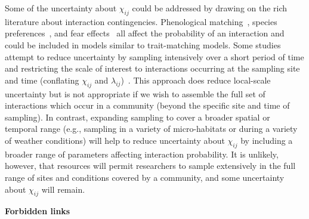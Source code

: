 \documentclass[12pt]{article}
\begin{document}
\begin{spacing}{1.5}
          Some of the uncertainty about $\chi_{ij}$ could be addressed by drawing on the rich literature about interaction contingencies. Phenological matching~\citep{MillerRushing2010}, species preferences~\citep{Pires2011a,Novak2015}, and fear effects~\citep{Luttbeg2005} all affect the probability of an interaction and could be included in models similar to trait-matching models. Some studies attempt to reduce uncertainty by sampling intensively over a short period of time and restricting the scale of interest to interactions occurring at the sampling site and time (conflating $\chi_{ij}$ and $\lambda_{ij}$)~\citep{Bartomeus2013,Weinstein2017a}. This approach does reduce local-scale uncertainty but is not appropriate if we wish to assemble the full set of interactions which occur in a community (beyond the specific site and time of sampling). In contrast, expanding sampling to cover a broader spatial or temporal range (e.g., sampling in a variety of micro-habitats or during a variety of weather conditions) will help to reduce uncertainty about $\chi_{ij}$ by including a broader range of parameters affecting interaction probability. It is unlikely, however, that resources will permit researchers to sample extensively in the full range of sites and conditions covered by a community, and some uncertainty about $\chi_{ij}$ will remain.



          \textbf{Forbidden links}


\end{spacing}
\end{document}
